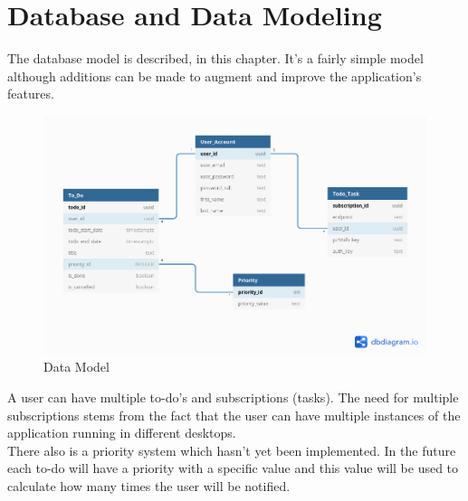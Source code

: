 \chapter{Database and Data Modeling}

	The database model is described, in this chapter. It's a fairly simple model although additions can be made to augment and improve the application's features.

	\begin{figure}[h!]
		\includegraphics[width=17cm,scale=0.6]{./images/data_model_2do}
		\caption{Data Model}
	\end{figure}

	A user can have multiple to-do's and subscriptions (tasks). The need for multiple subscriptions stems from the fact that the user can have multiple instances of the application running in different desktops.\\
	There also is a priority system which hasn't yet been implemented. In the future each to-do will have a priority with a specific value and this value will be used to calculate how many times the user will be notified.
	